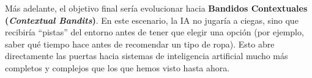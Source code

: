 Más adelante, el objetivo final sería evolucionar hacia \textbf{Bandidos
Contextuales (\emph{Contextual Bandits})}. En este escenario, la IA no
jugaría a ciegas, sino que recibiría ``pistas'' del entorno antes de
tener que elegir una opción (por ejemplo, saber qué tiempo hace antes de
recomendar un tipo de ropa). Esto abre directamente las puertas hacia
sistemas de inteligencia artificial mucho más completos y complejos que
los que hemos visto hasta ahora.
